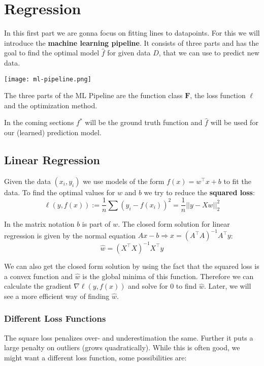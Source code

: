 \section{Regression}

In this first part we are gonna focus on fitting lines to datapoints. For this we will introduce the \textbf{machine learning pipeline}. It consists of three parts and has the goal to find the optimal model $\hat{f}$ for given data $D$, that we can use to predict new data.

\smallskip
\texttt{[image: ml-pipeline.png]}

The three parts of the ML Pipeline are the function class $\mathbf{F}$, the loss function $\ell$ and the optimization method. \medskip

In the coming sections $f^*$ will be the ground truth function and $\hat f$ will be used for our (learned) prediction model.

\subsection{Linear Regression}

Given the data $(x_i, y_i)$ we use models of the form $f(x) = w^\top x + b$ to fit the data. To find the optimal values for $w$ and $b$ we try to reduce the \textbf{squared loss}:
$$\ell(y, f(x)) := \frac{1}{n}\sum (y_i - f(x_i))^2 = \frac{1}{n}||y - X w||_2^2$$

In the matrix notation $b$ is part of $w$. The closed form solution for linear regression is given by the normal equation $Ax - b \Rightarrow x = (A^\top A)^{-1} A^\top y$:
$$\hat{w} = (X^\top X)^{-1}X^\top y$$

\columnbreak

We can also get the closed form solution by using the fact that the squared loss is a convex function and $\hat{w}$ is the global minima of this function. Therefore we can calculate the gradient $\nabla \ell(y, f(x))$ and solve for $0$ to find $\hat{w}$. Later, we will see a more efficient way of finding $\hat{w}$. \medskip

\subsubsection{Different Loss Functions}

The square loss penalizes over- and underestimation the same. Further it puts a large penalty on outliers (grows quadratically). While this is often good, we might want a different loss function, some possibilities are:

